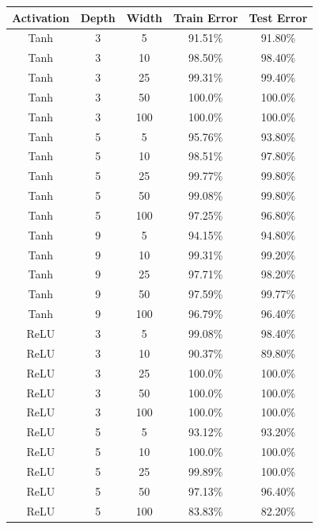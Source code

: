 \documentclass[12pt, fullpage,letterpaper]{article}
\begin{document}
\begin{enumerate}
\begin{enumerate}
	 \begin{table}[]
	     \centering
	     \begin{tabular}{c|cc|cc}
	        Activation & Depth & Width & Train Error & Test Error \\ \hline\hline
            Tanh & 3 & 5   & 91.51\% & 91.80\% \\ \hline
            Tanh & 3 & 10  & 98.50\% & 98.40\% \\ \hline
            Tanh & 3 & 25  & 99.31\% & 99.40\% \\ \hline
            Tanh & 3 & 50  & 100.0\% & 100.0\% \\ \hline
            Tanh & 3 & 100 & 100.0\% & 100.0\% \\ \hline
            Tanh & 5 & 5   & 95.76\% & 93.80\% \\ \hline
            Tanh & 5 & 10  & 98.51\% & 97.80\% \\ \hline
            Tanh & 5 & 25  & 99.77\% & 99.80\% \\ \hline
            Tanh & 5 & 50  & 99.08\% & 99.80\% \\ \hline
            Tanh & 5 & 100 & 97.25\% & 96.80\% \\ \hline
            Tanh & 9 & 5   & 94.15\% & 94.80\% \\ \hline
            Tanh & 9 & 10  & 99.31\% & 99.20\% \\ \hline
            Tanh & 9 & 25  & 97.71\% & 98.20\% \\ \hline
            Tanh & 9 & 50  & 97.59\% & 99.77\% \\ \hline
            Tanh & 9 & 100 & 96.79\% & 96.40\% \\ \hline
            ReLU & 3 & 5   & 99.08\% & 98.40\% \\ \hline
            ReLU & 3 & 10  & 90.37\% & 89.80\% \\ \hline
            ReLU & 3 & 25  & 100.0\% & 100.0\% \\ \hline
            ReLU & 3 & 50  & 100.0\% & 100.0\% \\ \hline
            ReLU & 3 & 100 & 100.0\% & 100.0\% \\ \hline
            ReLU & 5 & 5   & 93.12\% & 93.20\% \\ \hline
            ReLU & 5 & 10  & 100.0\% & 100.0\% \\ \hline
            ReLU & 5 & 25  & 99.89\% & 100.0\% \\ \hline
            ReLU & 5 & 50  & 97.13\% & 96.40\% \\ \hline
            ReLU & 5 & 100 & 83.83\% & 82.20\% \\ \hline

\end{tabular}
\end{table}
\end{enumerate}
\end{enumerate}
\end{document}
